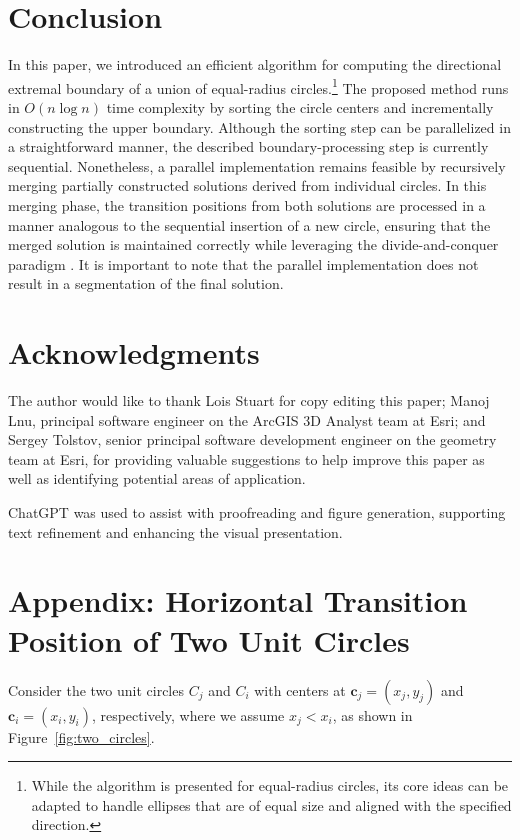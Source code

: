 \documentclass[12pt]{article}
\begin{document}
\section{Conclusion}

In this paper, we introduced an efficient algorithm for computing the directional extremal
boundary of a union of equal-radius circles.\footnote{While the algorithm is presented for equal-radius circles, its core ideas can be adapted to handle ellipses that are of equal size and aligned with the specified direction.}
The proposed method runs in $O(n \log n)$
time complexity by sorting the circle centers and incrementally constructing the upper
boundary. Although the sorting step can be parallelized in a straightforward manner,
the described boundary-processing step is currently sequential. Nonetheless, a parallel
implementation remains feasible by recursively merging partially constructed solutions
derived from individual circles. In this merging phase, the transition positions from both
solutions are processed in a manner analogous to the sequential insertion of a new circle,
ensuring that the merged solution is maintained correctly while leveraging the divide-and-conquer
paradigm \cite{Knuth1998}. It is important to note that the parallel implementation
does not result in a segmentation of the final solution.

\section*{Acknowledgments}

The author would like to thank Lois Stuart for copy editing this paper; Manoj Lnu,
principal software engineer on the ArcGIS 3D Analyst team at Esri; and Sergey Tolstov,
senior principal software development engineer on the geometry team at Esri, for
providing valuable suggestions to help improve this paper as well as identifying potential
areas of application.

ChatGPT was used to assist with proofreading and figure generation, supporting
text refinement and enhancing the visual presentation. \cite{OpenAI2024}

\section*{Appendix: Horizontal Transition Position of Two Unit Circles}
\label{sec:appendix}

Consider the two unit circles $C_j$ and $C_i$ with centers at $\mathbf{c}_j = (x_j, y_j)$
and $\mathbf{c}_i = (x_i, y_i)$, respectively, where we assume $x_j < x_i$, as shown in Figure~\ref{fig:two_circles}.
\end{document}
